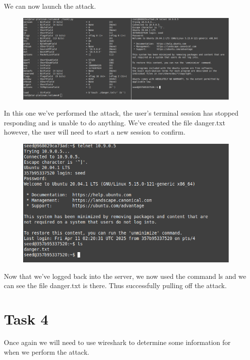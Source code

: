 \documentclass[12pt]{article}
\begin{document}
We can now launch the attack.

\begin{figure}
  \includegraphics*{Task32AttackPerform.png}
\end{figure}

In this one we've performed the attack, the user's terminal session has stopped responding and is unable to do anything. We've created the file danger.txt however, the 
user will need to start a new session to confirm.\\


\begin{figure}
  \includegraphics*{Task32RIGHTafterAttack.png}
\end{figure}

Now that we've logged back into the server, we now used the command ls and we can see the file danger.txt is there. Thus successfully pulling off the attack.\\



\section*{Task 4}
Once again we will need to use wireshark to determine some information for when we perform the attack.\\
\end{document}
